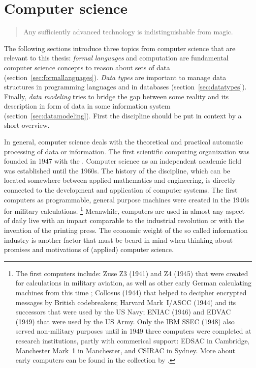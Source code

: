 \section{Computer science}
\label{sec:informatics}

\begin{quotation}%
Any sufficiently advanced technology is indistinguishable from magic.
\\ \quotationsource {}
\end{quotation}

\noindent
The following sections introduce three topics from computer science that 
are relevant to this thesis: \emph{formal languages} and computation are 
fundamental computer science concepts to reason about sets of data 
(section~\ref{sec:formallanguages}). \emph{Data types} are important to 
manage data structures in programming languages and in databases 
(section~\ref{sec:datatypes}). Finally, \emph{data modeling} tries to bridge 
the gap between  some reality and its description in form of data in some 
information system (section~\ref{sec:datamodeling}). First the discipline
should be put in context by a short overview.

In general, computer science deals with the theoretical and practical 
automatic processing of data or information. The first scientific computing 
organization was founded in 1947 with the . Computer science as an independent academic field was 
established until the 1960s. The history of the discipline, which can be 
located somewhere between applied mathematics and engineering, is 
directly connected to the development and application of computer systems. 
The first computers as programmable, general purpose machines were created in 
the 1940s for military calculations.%
\footnote{The first computers include: Zuse Z3 (1941) and Z4 (1945) 
that were created for calculations in military aviation, as
well as other early German calculating machines from this time 
\cite[p. 202ff.]{Lange2006};
Collosus (1944) that helped to decipher encrypted messages by British 
codebreakers; Harvard Mark~I/ASCC (1944) and its successors that were 
used by the US Navy; ENIAC (1946) and EDVAC (1949) that were used by 
the US Army. Only the IBM SSEC (1948) also served non-military purposes 
until in 1949 three computers were completed at research institutions, partly
with commerical support: EDSAC in Cambridge, Manchester Mark~1 in Manchester,
and CSIRAC in Sydney.
More about early computers can be found in the collection by
\textcite{Rojas2000}.}
Meanwhile, computers are used in almost any aspect of daily live with an
impact comparable to the industrial revolution or with the invention of 
the printing press. The economic weight of the so called information industry
is another factor that must be beard in mind when thinking about promises 
and motivations of (applied) computer science.

